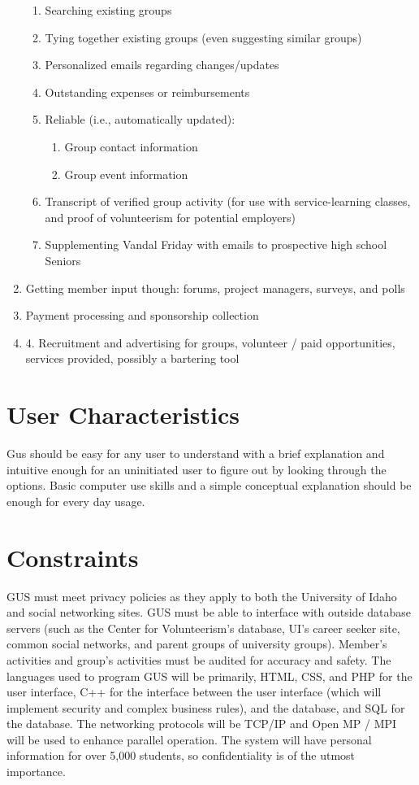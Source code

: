 \begin{enumerate}
\begin{enumerate}
				\item Searching existing groups
				\item Tying together existing groups (even suggesting
					similar groups)
				\item Personalized emails regarding changes/updates
				\item Outstanding expenses or reimbursements
				\item Reliable (i.e., automatically updated):
				\begin{enumerate}
					\item Group contact information
					\item Group event information
				\end{enumerate}
				\item Transcript of verified group activity (for use with
					service-learning classes, and proof of volunteerism
					for potential employers)
				\item Supplementing Vandal Friday with emails to
					prospective high school Seniors
			\end{enumerate}
			\item Getting member input though: forums, project managers,
				surveys, and polls
			\item Payment processing and sponsorship collection
			\item 4. Recruitment and advertising for groups, volunteer
				/ paid opportunities, services provided, possibly a
				bartering tool
		\end{enumerate}
	\section{User Characteristics}
		Gus should be easy for any user to understand with a brief
		explanation and intuitive enough for an uninitiated user to
		figure out by looking through the options. Basic computer use
		skills and a simple conceptual explanation should be enough for
		every day usage.
	\section{Constraints}
		GUS must meet privacy policies as they apply to both the
		University of Idaho and social networking sites.  GUS must be
		able to interface with outside database servers (such as the
		Center for Volunteerism's database, UI's career seeker site,
		common social networks, and parent groups of university groups).
		Member's activities and group's activities must be audited for
		accuracy and safety.  The languages used to program GUS will be
		primarily, HTML, CSS, and PHP for the user interface, C++ for
		the interface between the user interface (which will implement
		security and complex business rules), and the database, and
		SQL for the database.  The networking protocols will be TCP/IP
		and Open MP / MPI will be used to enhance parallel operation.
		The system will have personal information for over 5,000
		students, so confidentiality is of the utmost importance.
